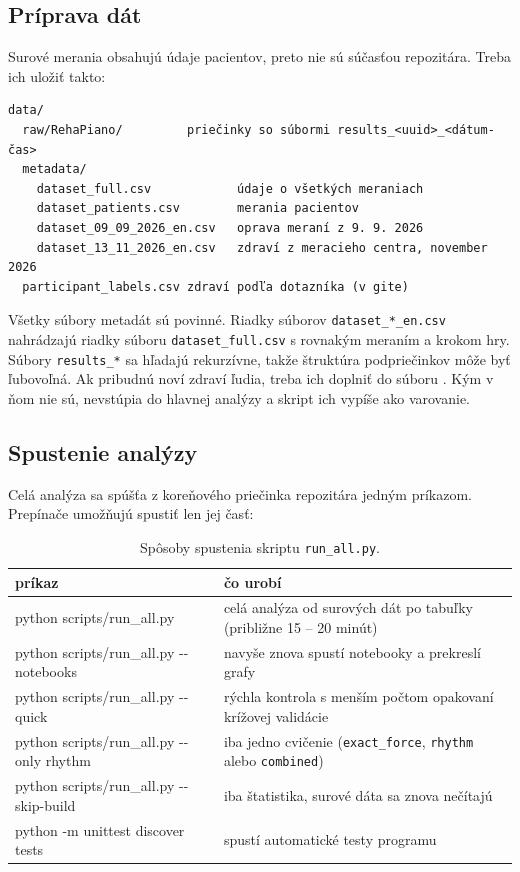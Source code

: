 \documentclass[12pt,a4paper]{article}
\begin{document}
\subsection{Príprava dát}

Surové merania obsahujú údaje pacientov, preto nie sú súčasťou repozitára. Treba ich uložiť takto:
\begin{verbatim}
data/
  raw/RehaPiano/         priečinky so súbormi results_<uuid>_<dátum-čas>
  metadata/
    dataset_full.csv            údaje o všetkých meraniach
    dataset_patients.csv        merania pacientov
    dataset_09_09_2026_en.csv   oprava meraní z 9. 9. 2026
    dataset_13_11_2026_en.csv   zdraví z meracieho centra, november 2026
  participant_labels.csv zdraví podľa dotazníka (v gite)
\end{verbatim}
Všetky súbory metadát sú povinné. Riadky súborov \texttt{dataset\_*\_en.csv} nahrádzajú riadky súboru
\texttt{dataset\_full.csv} s rovnakým meraním a krokom hry. Súbory \texttt{results\_*} sa hľadajú rekurzívne, takže štruktúra podpriečinkov môže byť ľubovoľná. Ak pribudnú
noví zdraví ľudia, treba ich doplniť do súboru . Kým v ňom nie sú, nevstúpia do
hlavnej analýzy a skript ich vypíše ako varovanie.

\subsection{Spustenie analýzy}

Celá analýza sa spúšťa z koreňového priečinka repozitára jedným príkazom. Prepínače umožňujú spustiť len jej časť:

\begin{table}[H]
\centering\small
\caption{Spôsoby spustenia skriptu \texttt{run\_all.py}.}
\begin{tabularx}{\textwidth}{@{}>{\ttfamily\raggedright\arraybackslash}p{6.6cm} L@{}}
\toprule
\normalfont príkaz & čo urobí \\
\midrule
python scripts/run\_all.py & celá analýza od surových dát po tabuľky (približne 15 -- 20 minút) \\
python scripts/run\_all.py -{}-notebooks & navyše znova spustí notebooky a prekreslí grafy \\
python scripts/run\_all.py -{}-quick & rýchla kontrola s menším počtom opakovaní krížovej validácie \\
python scripts/run\_all.py -{}-only rhythm & iba jedno cvičenie (\texttt{exact\_force}, \texttt{rhythm} alebo \texttt{combined}) \\
python scripts/run\_all.py -{}-skip-build & iba štatistika, surové dáta sa znova nečítajú \\
python -m unittest discover tests & spustí automatické testy programu \\
\bottomrule
\end{tabularx}
\end{table}
\end{document}

